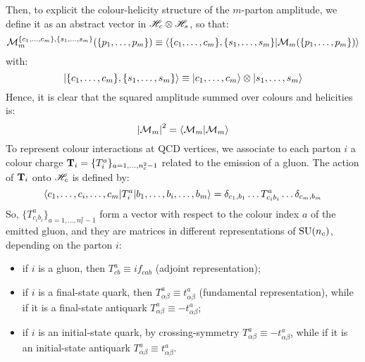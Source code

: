 Then, to explicit the colour-helicity structure of the $ m $-parton amplitude, we define it as an abstract vector in $ \mathscr{H}_c \otimes \mathscr{H}_s $, so that:
\begin{equation}
  \mathcal{M}_m^{\{c_1, \dots, c_m\}, \{s_1, \dots, s_m\}}(\{p_1, \dots, p_m\}) \equiv \braket{\{c_1, \dots, c_m\}, \{s_1, \dots, s_m\} | \mathcal{M}_m(\{p_1, \dots, p_m\})}
\end{equation}
with:
\begin{equation*}
  \ket{\{c_1, \dots, c_m\}, \{s_1, \dots, s_m\}} \equiv \ket{c_1, \dots, c_m} \otimes \ket{s_1, \dots, s_m}
\end{equation*}
Hence, it is clear that the squared amplitude summed over colours and helicities is:
\begin{equation}
  \left\lvert\mathcal{M}_m\right\rvert^2 = \braket{\mathcal{M}_m | \mathcal{M}_m}
\end{equation}
To represent colour interactions at QCD vertices, we associate to each parton $ i $ a colour charge $ \mathbf{T}_i = \{T_i^a\}_{a = 1, \dots, n_c^2 - 1} $ related to the emission of a gluon. The action of $ \mathbf{T}_i $ onto $ \mathscr{H}_c $ is defined by:
\begin{equation}
  \braket{c_1, \dots, c_i, \dots, c_m | T_i^a | b_1, \dots, b_i, \dots, b_m} = \delta_{c_1, b_1} \dots T^a_{c_i b_i} \dots \delta_{c_m, b_m}
  \label{eq:t-act}
\end{equation}
So, $ \{T^a_{c_i b_i}\}_{a = 1, \dots, n_c^2 - 1} $ form a vector with respect to the colour index $ a $ of the emitted gluon, and they are matrices in different representations of $ \mathrm{SU}(n_c) $, depending on the parton $ i $:
\begin{itemize}
  \item if $ i $ is a gluon, then $ T^a_{cb} \equiv i f_{cab} $ (adjoint representation);
  \item if $ i $ is a final-state quark, then $ T^a_{\alpha \beta} \equiv t^a_{\alpha \beta} $ (fundamental representation), while if it is a final-state antiquark $ T^a_{\alpha \beta} \equiv - t^a_{\alpha \beta} $;
  \item if $ i $ is an initial-state quark, by crossing-symmetry $ T^a_{\alpha \beta} \equiv - t^a_{\alpha \beta}$, while if it is an initial-state antiquark $ T^a_{\alpha \beta} \equiv t^a_{\alpha \beta} $.
\end{itemize}

